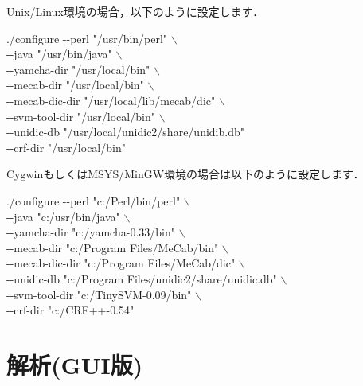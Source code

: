 \documentclass[titlepage]{jarticle}
\begin{document}
Unix/Linux環境の場合，以下のように設定します．
\begin{screen}
./configure {-}{-}perl "/usr/bin/perl" $\backslash$ \\
\hspace{5mm} {-}{-}java "/usr/bin/java" $\backslash$ \\
\hspace{5mm} {-}{-}yamcha-dir "/usr/local/bin" $\backslash$ \\
\hspace{5mm} {-}{-}mecab-dir "/usr/local/bin" $\backslash$ \\
\hspace{5mm} {-}{-}mecab-dic-dir "/usr/local/lib/mecab/dic" $\backslash$ \\
\hspace{5mm} {-}{-}svm-tool-dir "/usr/local/bin" $\backslash$ \\
\hspace{5mm} {-}{-}unidic-db "/usr/local/unidic2/share/unidib.db" \\
\hspace{5mm} {-}{-}crf-dir "/usr/local/bin"
\end{screen}
\clearpage
CygwinもしくはMSYS/MinGW環境の場合は以下のように設定します．
\begin{screen}
./configure {-}{-}perl "c:/Perl/bin/perl" $\backslash$ \\
\hspace{5mm} {-}{-}java "c:/usr/bin/java" $\backslash$ \\
\hspace{5mm} {-}{-}yamcha-dir "c:/yamcha-0.33/bin" $\backslash$ \\
\hspace{5mm} {-}{-}mecab-dir "c:/Program Files/MeCab/bin" $\backslash$ \\
\hspace{5mm} {-}{-}mecab-dic-dir "c:/Program Files/MeCab/dic" $\backslash$ \\
\hspace{5mm} {-}{-}unidic-db "c:/Program Files/unidic2/share/unidic.db" $\backslash$ \\
\hspace{5mm} {-}{-}svm-tool-dir "c:/TinySVM-0.09/bin" $\backslash$ \\
\hspace{5mm} {-}{-}crf-dir "c:/CRF++-0.54"
\end{screen}




\section{解析(GUI版)}
\end{document}
